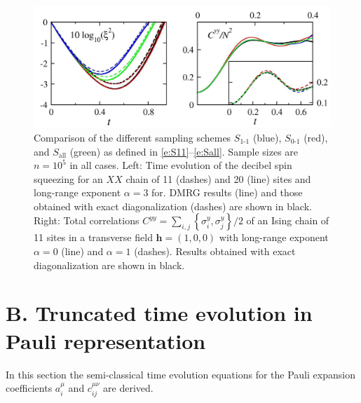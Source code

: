 \documentclass[aps,prl,showpacs,amsmath,amssymb,superscriptaddress,reprint,10pt]{revtex4-1}
\newcommand{\mvec}[1]{\boldsymbol #1}
\begin{document}
\begin{figure}\centering
\includegraphics[width=\linewidth]{./benchmark_sizes_XY_alpha_TF.jpg}
\caption{\label{f:sampling_2}%
Comparison of the different sampling schemes $S_{\text{1-1}}$ (blue), $S_{\text{0-1}}$ (red), and $S_{\text{all}}$ (green) as defined in \eqref{e:S11}--\eqref{e:Sall}. Sample sizes are $n=10^5$ in all cases. Left: Time evolution of the decibel spin squeezing for an $XX$ chain of 11 (dashes) and 20 (line) sites and long-range exponent $\alpha=3$ for. DMRG results (line) and those obtained with exact diagonalization (dashes) are shown in black. Right: Total correlations $C^{yy}=\sum_{i,j}\left\{\sigma_i^y,\sigma_j^y\right\}/2$ of an Ising chain of 11 sites in a transverse field $\mvec{h}=(1,0,0)$ with long-range exponent $\alpha=0$ (line) and $\alpha=1$ (dashes). Results obtained with exact diagonalization are shown in black.
}%
\end{figure}

\section{B. Truncated time evolution in Pauli representation}
\setcounter{section}{2}
\setcounter{equation}{0}
\setcounter{figure}{0}

In this section the semi-classical time evolution equations for the Pauli expansion coefficients $a_i^\mu$ and $c_{ij}^{\mu\nu}$ are derived.
\end{document}
